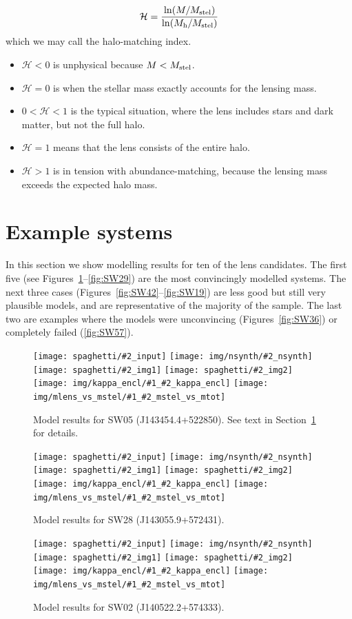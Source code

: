 \documentclass[fleqn,usenatbib]{mnras}
\newcommand{\inclfign}[2]{
  \centering
	\texttt{[image: spaghetti/\#2\_input]}%
	\texttt{[image: img/nsynth/\#2\_nsynth]}
	\texttt{[image: spaghetti/\#2\_img1]}%
	\texttt{[image: spaghetti/\#2\_img2]}
	\texttt{[image: img/kappa\_encl/\#1\_\#2\_kappa\_encl]}%
	\texttt{[image: img/mlens\_vs\_mstel/\#1\_\#2\_mstel\_vs\_mtot]}
}
\newcommand{\figref}[1]{\ref{fig:#1}}
\newcommand{\Mstel}{M_{\rm stel}}
\newcommand{\Mhalo}{M_{\rm h}}
\newcommand{\haloindex}{\mathcal{H}}
\begin{document}
\begin{equation}
\haloindex = \frac{\ln(M/\Mstel)}{\ln(\Mhalo/\Mstel)}
\end{equation}
which we may call the halo-matching index.
\begin{itemize}
\item $\haloindex < 0$ is unphysical because $M<\Mstel$.
\item $\haloindex = 0$ is when the stellar mass exactly accounts for the
  lensing mass.
\item $0 < \haloindex < 1$ is the typical situation, where the lens
  includes stars and dark matter, but not the full halo.
\item $\haloindex = 1$ means that the lens consists of the entire halo.
\item $\haloindex > 1$ is in tension with abundance-matching, because the
  lensing mass exceeds the expected halo mass.
\end{itemize}


\section{Example systems}\label{sec:examples}

In this section we show modelling results for ten of the lens
candidates.  The first five (see Figures~\figref{SW05}--\figref{SW29})
are the most convincingly modelled systems.  The next three cases
(Figures~\figref{SW42}--\figref{SW19}) are less good but still very
plausible models, and are representative of the majority of the
sample.  The last two are examples where the models were unconvincing
(Figures~\figref{SW36}) or completely failed (\figref{SW57}).

\begin{figure}
  \inclfign{SW05}{ASW0007k4r_N7LTELSYTM}
  \caption{Model results for SW05 (J143454.4+522850).  See text in
    Section~\ref{sec:examples} for details.}
  \label{fig:SW05}
\end{figure}

\begin{figure}
  \inclfign{SW28}{ASW0007xrs_JHC3J2HYV7}
  \caption{Model results for SW28 (J143055.9+572431).}
  \label{fig:SW28}
\end{figure}

\begin{figure}
  \inclfign{SW02}{ASW000619d_011489}
  \caption{Model results for SW02 (J140522.2+574333).}
  \label{fig:SW02}
\end{figure}
\end{document}

